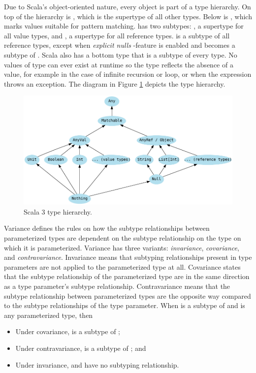 Due to Scala's object-oriented nature, every object is part of a type hierarchy. On top of the hierarchy is , which is the supertype of all other types. Below  is , which marks values suitable for pattern matching.  has two subtypes: , a supertype for all value types, and , a supertype for all reference types.  is a subtype of all reference types, except when \textit{explicit nulls} -feature is enabled and  becomes a subtype of . Scala also has a bottom type  that is a subtype of every type. No values of type  can ever exist at runtime so the type reflects the absence of a value, for example in the case of infinite recursion or loop, or when the expression throws an exception. The diagram in Figure \ref{fig:scala-type-hierarchy} depicts the type hierarchy.

\begin{figure}
    \centering
    \includegraphics{images/type-hierarchy}
    \caption{Scala 3 type hierarchy.}
    \label{fig:scala-type-hierarchy}
\end{figure}

Variance defines the rules on how the subtype relationships between parameterized types are dependent on the subtype relationship on the type on which it is parameterized. Variance has three variants: \textit{invariance}, \textit{covariance}, and \textit{contravariance}. Invariance means that subtyping relationships present in type parameters are not applied to the parameterized type at all. Covariance states that the subtype relationship of the parameterized type are in the same direction as a type parameter's subtype relationship. Contravariance means that the subtype relationship between parameterized types are the opposite way compared to the subtype relationships of the type parameter. When  is a subtype of  and  is any parameterized type, then
\begin{itemize}
    \item Under covariance,  is a subtype of ;
    \item Under contravariance,  is a subtype of ; and
    \item Under invariance,  and  have no subtyping relationship.
\end{itemize}

